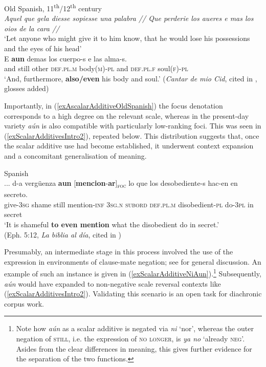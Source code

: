 {\begin{exe}
	\ex Old Spanish, 11\textsuperscript{th}/12\textsuperscript{th} century\label{exAscalarAdditiveOldSpanish}\\
	\textit{Aquel que gela diesse sopiesse una palabra // Que perderie los aueres e mas los oios de la cara //}\\
	\lq Let anyone who might give it to him know, that he would lose his possessions and the eyes of his head\rq{}\\
	\gll  E \textbf{aun} demas los cuerpo-s e las alma-s.\\
	and still  other \textsc{def}.\textsc{pl}.\textsc{m} body(\textsc{m})-\textsc{pl} and \textsc{def}.\textsc{pl}.\textsc{f} soul(\textsc{f})-\textsc{pl}\\
	\glt \lq And, furthermore, \textbf{also/even} his body and soul.\rq{ }(\textit{Cantar de mio Cid}, cited in \cite[79]{Trujillo1990}, glosses added)
\end{exe}

Importantly, in (\ref{exAscalarAdditiveOldSpanish}) the focus denotation corresponds to a high degree on the relevant scale, whereas in the present-day variety \textit{aún} is also compatible with particularly low-ranking foci. This was seen in (\ref{exScalarAdditivesIntro2}), repeated below. This distribution suggests that, once the scalar additive use had become established, it underwent context expansion and a concomitant generalisation of meaning.

\begin{exe}
	 Spanish\\
	\gll ... d-a vergüenza \textbf{aun} \textup{[}\textbf{mencion}-\textbf{ar}\textup{]\textsubscript{\textsc{foc}}} lo que los desobediente-s hac-en en secreto.\\
	{} give-3\textsc{sg} shame still \phantom{[}mention-\textsc{inf} 3\textsc{sg}.\textsc{n} \textsc{subord} \textsc{def}.\textsc{pl}.\textsc{m} disobedient-\textsc{pl} do-3\textsc{pl} in secret\\
	\glt \lq It is shameful \textbf{to even mention} what the disobedient do in secret.'
	\\(Eph. 5:12, \textit{La biblia al día}, cited in \cite[2]{GastvanderAuwera2011})
\end{exe}

Presumably, an intermediate stage in this process involved the use of the expression in environments of clause-mate negation; see \textcite{GastvanderAuwera2011} for general discussion. An example of such an instance is given in (\ref{exScalarAdditiveNiAun}).\footnote{Note how \textit{aún} as a scalar additive is negated via \textit{ni} \lq nor\rq{}, whereas the outer negation of \textsc{still}, i.e. the expression of \textsc{no longer}, is \textit{ya no} \lq already \textsc{neg}\rq{}. Asides from the clear differences in meaning, this gives further evidence for the separation of the two functions.} Subsequently, \textit{aún} would have expanded to non-negative scale reversal contexts like (\ref{exScalarAdditivesIntro2}). Validating this scenario is an open task for diachronic corpus work.\largerpage[2.15]

}
